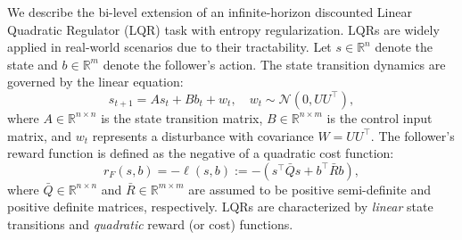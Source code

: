 \documentclass[letterpaper]{article} %
\providecommand{\R}{\mathbb{R}} %
\begin{document}
We describe the bi-level extension of an infinite-horizon discounted Linear Quadratic Regulator (LQR) task with entropy regularization.
LQRs are widely applied in real-world scenarios due to their tractability.
Let $s \in \R^n$ denote the state and $b \in \R^m$ denote the follower's action. 
The state transition dynamics are governed by the linear equation:
\begin{equation}
    s_{t+1} = A s_{t} + B b_{t} + w_t,  \quad w_t\sim  \mathcal{N}(0,UU^\top), \label{eq:lqr_with_disturbance}
\end{equation}
where $A \in \R^{n\times n}$ is the state transition matrix, $B \in \R^{n \times m}$ is the control input matrix, and $w_t$ represents a disturbance with covariance $W=UU^\top$.
The follower's reward function is defined as the negative of a quadratic cost function:
\begin{equation}
    r_F(s, b) = -\ell(s,b) := - (s^{\top} \bar{Q} s + b^{\top} \bar{R} b),
\end{equation}
where $\bar{Q} \in \R^{n\times n}$ and $\bar{R} \in \R^{m\times m}$ are assumed to be positive semi-definite and positive definite matrices, respectively. 
LQRs are characterized by \emph{linear} state transitions and \emph{quadratic} reward (or cost) functions.
\end{document}
